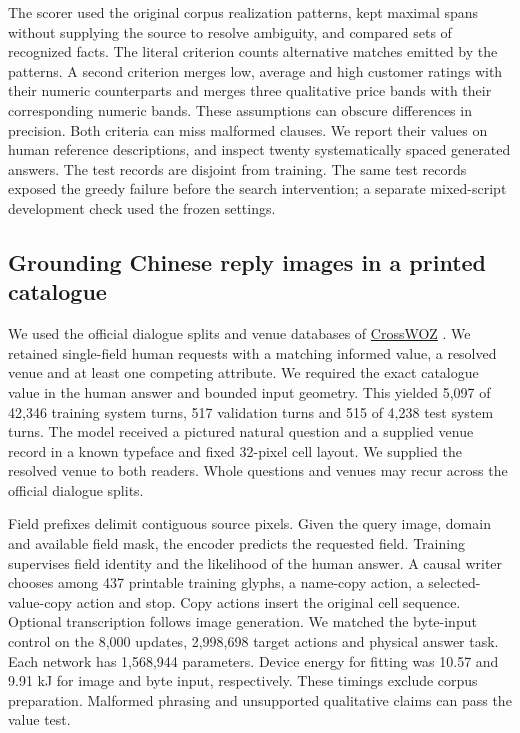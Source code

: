 \documentclass[12pt,a4paper]{article}
\providecommand{\DIFadd}[1]{{\protect\color{blue} \sf #1}} %
\begin{document}
\DIFadd{The scorer used the original corpus realization patterns, kept maximal spans without supplying the source to resolve ambiguity, and compared sets of recognized facts. The literal criterion counts alternative matches emitted by the patterns. A second criterion merges low, average and high customer ratings with their numeric counterparts and merges three qualitative price bands with their corresponding numeric bands. These assumptions can obscure differences in precision. Both criteria can miss malformed clauses. We report their values on human reference descriptions, and inspect twenty systematically spaced generated answers. The test records are disjoint from training. The same test records exposed the greedy failure before the search intervention; a separate mixed-script development check used the frozen settings.
}

\subsection*{\DIFadd{Grounding Chinese reply images in a printed catalogue}}
\DIFadd{We used the official dialogue splits and venue databases of }\href{https://github.com/thu-coai/CrossWOZ}{\DIFadd{CrossWOZ}}\DIFadd{. We retained single-field human requests with a matching informed value, a resolved venue and at least one competing attribute. We required the exact catalogue value in the human answer and bounded input geometry. This yielded 5,097 of 42,346 training system turns, 517 validation turns and 515 of 4,238 test system turns. The model received a pictured natural question and a supplied venue record in a known typeface and fixed 32-pixel cell layout. We supplied the resolved venue to both readers. Whole questions and venues may recur across the official dialogue splits.
}

\DIFadd{Field prefixes delimit contiguous source pixels. Given the query image, domain and available field mask, the encoder predicts the requested field. Training supervises field identity and the likelihood of the human answer. A causal writer chooses among 437 printable training glyphs, a name-copy action, a selected-value-copy action and stop. Copy actions insert the original cell sequence. Optional transcription follows image generation. We matched the byte-input control on the 8,000 updates, 2,998,698 target actions and physical answer task. Each network has 1,568,944 parameters. Device energy for fitting was 10.57 and 9.91 kJ for image and byte input, respectively. These timings exclude corpus preparation. Malformed phrasing and unsupported qualitative claims can pass the value test.
}
\end{document}
